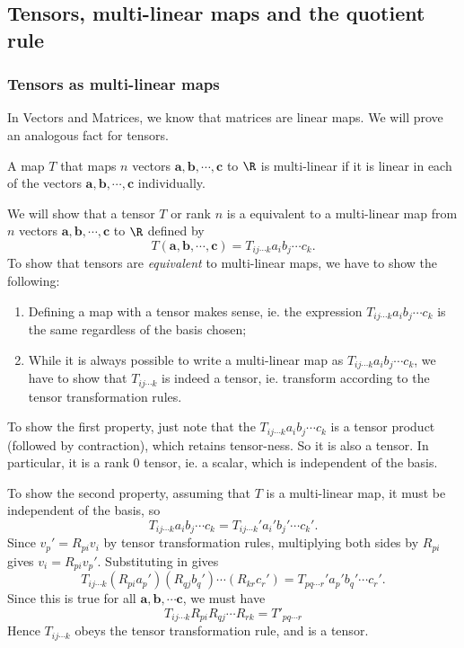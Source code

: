 \documentclass[a4paper]{article}
\begin{document}
\subsection{Tensors, multi-linear maps and the quotient rule}
\subsubsection*{Tensors as multi-linear maps}
In Vectors and Matrices, we know that matrices are linear maps. We will prove an analogous fact for tensors.

\begin{defi}
  A map $T$ that maps $n$ vectors $\mathbf{a}, \mathbf{b}, \cdots, \mathbf{c}$ to $\R$ is multi-linear if it is linear in each of the vectors $\mathbf{a}, \mathbf{b}, \cdots, \mathbf{c}$ individually.
\end{defi}

We will show that a tensor $T$ or rank $n$ is a equivalent to a multi-linear map from $n$ vectors $\mathbf{a}, \mathbf{b}, \cdots, \mathbf{c}$ to $\R$ defined by
\[
  T(\mathbf{a}, \mathbf{b}, \cdots, \mathbf{c}) = T_{ij \cdots k} a_ib_j\cdots c_k.
\]
To show that tensors are \emph{equivalent} to multi-linear maps, we have to show the following:
\begin{enumerate}
  \item Defining a map with a tensor makes sense, ie. the expression $T_{ij\cdots k}a_ib_j\cdots c_k$ is the same regardless of the basis chosen;
  \item While it is always possible to write a multi-linear map as $T_{ij \cdots k} a_ib_j\cdots c_k$, we have to show that $T_{ij\cdots k}$ is indeed a tensor, ie. transform according to the tensor transformation rules.
\end{enumerate}

To show the first property, just note that the $T_{ij \cdots k} a_ib_j\cdots c_k$ is a tensor product (followed by contraction), which retains tensor-ness. So it is also a tensor. In particular, it is a rank 0 tensor, ie. a scalar, which is independent of the basis.

To show the second property, assuming that $T$ is a multi-linear map, it must be independent of the basis, so
\[
  T_{ij \cdots k} a_ib_j\cdots c_k = T_{ij\cdots k}' a_i' b_j' \cdots c_k'.
\]
Since $v_p' = R_{pi}v_i$ by tensor transformation rules, multiplying both sides by $R_{pi}$ gives $v_i = R_{pi} v_p'$. Substituting in gives
\[
  T_{ij\cdots k} (R_{pi}a_p')(R_{qj}b_q')\cdots (R_{kr}c_r') = T_{pq\cdots r}' a_p' b_q' \cdots c_r'.
\]
Since this is true for all $\mathbf{a}, \mathbf{b}, \cdots \mathbf{c}$, we must have
\[
  T_{ij\cdots k}R_{pi}R_{qj}\cdots R_{rk} = T'_{pq\cdots r}
\]
Hence $T_{ij\cdots k}$ obeys the tensor transformation rule, and is a tensor.
\end{document}
